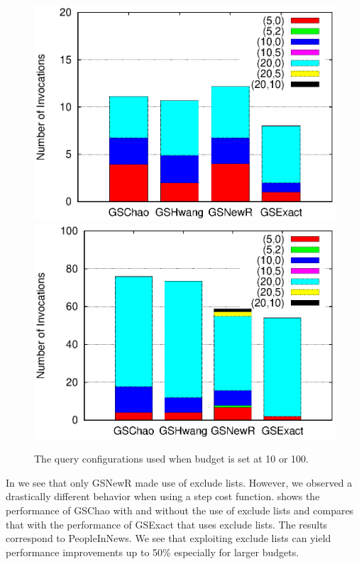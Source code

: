 \begin{figure}[h]
   	 \includegraphics[clip,scale=0.32]{figs/queryConfBudget10.eps}
	\includegraphics[clip,scale=0.32]{figs/queryConfBudget100.eps}
	\caption{The query configurations used when budget is set at 10 or 100.}\label{fig:queryconf}
		\vspace{-20pt}
\end{figure}

\vspace{3pt} In  we see that only GSNewR made use of exclude lists. However, we observed a drastically different behavior when using a step cost function.  shows the performance of GSChao with and without the use of exclude lists and compares that with the performance of GSExact that uses exclude lists. The results correspond to PeopleInNews. We see that exploiting exclude lists can yield performance improvements up to 50\% especially for larger budgets.


